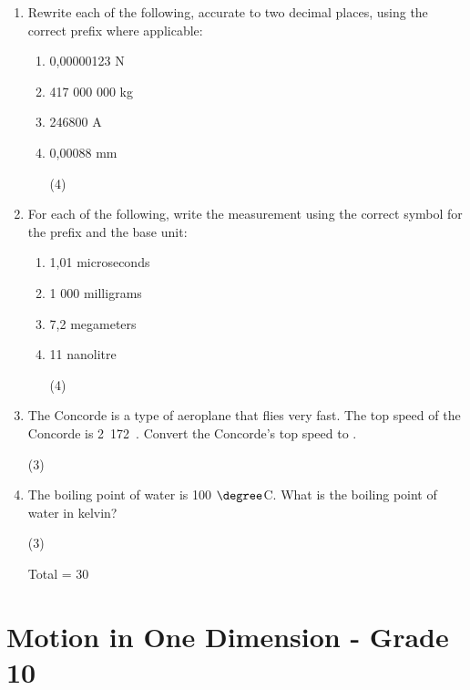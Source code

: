 \begin{enumerate}
\item{Rewrite each of the following, accurate to two decimal places, using the correct prefix where applicable:
\begin{enumerate}
\item{0,00000123 N}
\item{417 000 000 kg}
\item{246800 A}
\item{0,00088 mm}
\begin{flushright}
(4)
\end{flushright}
\end {enumerate}}

\item{For each of the following, write the measurement using the correct symbol for the prefix and the base unit:
\begin{enumerate}
\item{1,01 microseconds}
\item{1 000 milligrams}
\item{7,2 megameters}
\item{11 nanolitre}
\begin{flushright}
(4)
\end{flushright}
\end{enumerate}}

\item{The Concorde is a type of aeroplane that flies very fast. The top speed of the Concorde is 2~172~\kph. Convert the Concorde's top speed to \ms.}
\begin{flushright}
(3)
\end{flushright}

\item{The boiling point of water is 100 $\degree$C. What is the boiling point of water in kelvin?}
\begin{flushright}
(3)
\end{flushright}
\begin{flushright}
Total = 30
\end{flushright}
\end{enumerate}





\chapter{Motion in One Dimension - Grade 10}
\label{p:m1d10}




